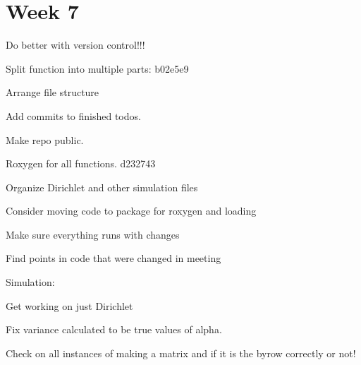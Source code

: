 \documentclass[10pt]{article}
\newcommand{\cmark}{\ding{51}}%
\newcommand{\done}{\rlap{$\square$}{\raisebox{2pt}{\large\hspace{1pt}\cmark}}%
\hspace{-2.5pt}}
\theoremstyle{definition}
\begin{document}
\section{Week 7}
\begin{todolist}
  \item[\done] Do better with version control!!!
  \item[\done] Split function into multiple parts: b02e5e9
  \item[\done] Arrange file structure
  \item[\done] Add commits to finished todos.
  \item[\done] Make repo public.
  \item[\done] Roxygen for all functions. d232743
  \item[\done] Organize Dirichlet and other simulation files
  \item Consider moving code to package for roxygen and loading
  \item Make sure everything runs with changes
  \item Find points in code that were changed in meeting
  \item Simulation:
  \item Get working on just Dirichlet
  \item Fix variance calculated to be true values of alpha.
  \item Check on all instances of making a matrix and if it is the byrow correctly or not!
\end{todolist}
\end{document}
